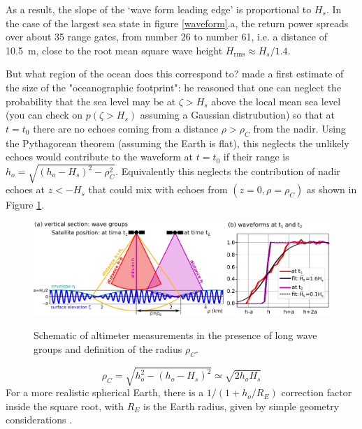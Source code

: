 As a result, 
the slope of the `wave form leading edge' is proportional to  $H_s$.  
In the case of the largest sea state in figure \ref{waveform}.a, the return 
power spreads over about 35 range gates, from number 26 to number 61, i.e. a distance of 10.5~m, close to the root mean square wave height
 $H_{\mathrm{rms}} \approx  H_{s}/1.4$. %

But what region of the ocean does this correspond to? \cite{Chelton&al.1989} made a first estimate of the size of the "oceanographic footprint": he reasoned that one can neglect the probability that the sea level may be at $\zeta > H_s$ above the local mean sea level (you can check on $p(\zeta > H_s)$ assuming a Gaussian distrubution)  so that at $t=t_0$ there are no echoes coming from a distance $\rho > \rho_C$ from the nadir.  Using the Pythagorean theorem (assuming the Earth is flat), this neglects the unlikely echoes would contribute to the waveform at $t=t_0$ if their range is $h_o=\sqrt{(h_o-H_s)^2-\rho_C^2}$.  Equivalently this neglects the contribution of nadir echoes at $z< -H_s$ that could mix with echoes from $(z=0,\rho=\rho_C)$ as shown in Figure \ref{fig:group_alti}.
\begin{figure}[htb]
\centerline{\includegraphics[width=\textwidth]{FIGS_CH_SAT/wave_group_schematic.pdf}}
  \caption{Schematic of altimeter measurements in the presence of long wave groups and definition of the \cite{Chelton&al.1989} radius $\rho_C$.}{} \label{fig:group_alti}
\end{figure}
\begin{equation}
    \rho_C =\sqrt{h_o^2- (h_o-H_s)^2} \simeq \sqrt{ 2 h_o H_s} \label{eq:rC} 
\end{equation}
For a more realistic spherical Earth, there is a $1/(1+h_o/R_E)$ correction factor inside the square root, with $R_E$ is the Earth radius, given by simple geometry considerations  \citep{Chelton&al.1989}.


